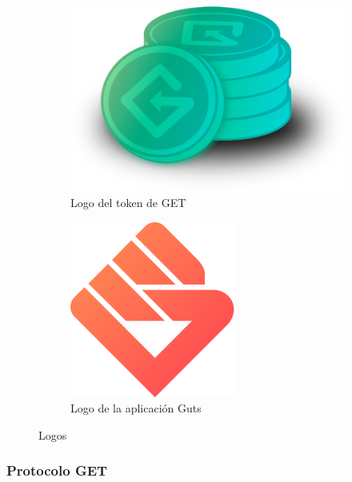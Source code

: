 \begin{figure}[hbt]
	\centering
	\begin{subfigure}[b]{0.4\linewidth}
		\centering
		\includegraphics[width=0.8\linewidth]{figs/EstadoArte/Apps/getTOKEN.png}
		\caption{Logo del token de GET}\label{fig:getTOKEN}
	\end{subfigure} 
	\begin{subfigure}[b]{0.4\linewidth}
		\centering
		\includegraphics[width=0.8\linewidth]{figs/EstadoArte/Apps/gutsLOGO.png}
		\caption{Logo de la aplicación Guts}\label{fig:gutsLOGO}
	\end{subfigure} 
	\caption[Logos de Guts y GET]{Logos}
	\label{fig:Logos}
\end{figure}

\subsubsection{Protocolo GET}

